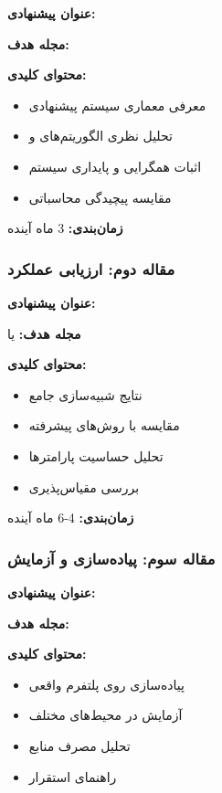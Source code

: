 \documentclass[11pt]{article}
\begin{document}
\textbf{عنوان پیشنهادی:} 

\textbf{مجله هدف:} 

\textbf{محتوای کلیدی:}
\begin{itemize}
\item معرفی معماری سیستم پیشنهادی
\item تحلیل نظری الگوریتم‌های  و 
\item اثبات همگرایی و پایداری سیستم
\item مقایسه پیچیدگی محاسباتی
\end{itemize}

\textbf{زمان‌بندی:} 3 ماه آینده

\subsubsection{مقاله دوم: ارزیابی عملکرد}

\textbf{عنوان پیشنهادی:} 

\textbf{مجله هدف:}  یا 

\textbf{محتوای کلیدی:}
\begin{itemize}
\item نتایج شبیه‌سازی جامع
\item مقایسه با روش‌های پیشرفته
\item تحلیل حساسیت پارامترها
\item بررسی مقیاس‌پذیری
\end{itemize}

\textbf{زمان‌بندی:} 4-6 ماه آینده

\subsubsection{مقاله سوم: پیاده‌سازی و آزمایش}

\textbf{عنوان پیشنهادی:} 

\textbf{مجله هدف:} 

\textbf{محتوای کلیدی:}
\begin{itemize}
\item پیاده‌سازی روی پلتفرم واقعی
\item آزمایش در محیط‌های مختلف
\item تحلیل مصرف منابع
\item راهنمای استقرار
\end{itemize}
\end{document}
